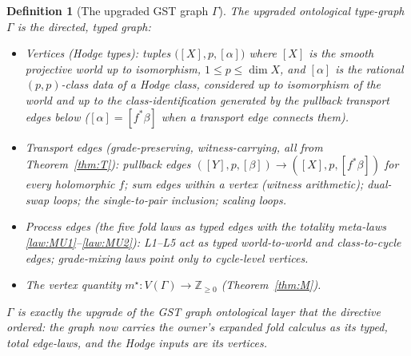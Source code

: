 \documentclass[11pt]{article}
\newtheorem{definition}[theorem]{Definition}
\newcommand{\Z}{\mathbb{Z}}
\begin{document}
\begin{definition}[The upgraded GST graph $\Gamma$]
\label{def:gamma}
The \emph{upgraded ontological type-graph} $\Gamma$ is the directed,
typed graph:
\begin{itemize}
\item \emph{Vertices} (Hodge types): tuples
$\bigl([X],p,[\alpha]\bigr)$ where $[X]$ is the smooth projective world up
to isomorphism, $1\le p\le\dim X$, and $[\alpha]$ is the rational
$(p,p)$-class data of a Hodge class, considered up to isomorphism of the
world and up to the class-identification generated by the pullback transport
edges below ($[\alpha]=[f^*\beta]$ when a transport edge connects them).
\item \emph{Transport edges} (grade-preserving, witness-carrying, all from
Theorem~\ref{thm:T}): pullback edges
$([Y],p,[\beta])\to([X],p,[f^*\beta])$ for every holomorphic $f$;
sum edges within a vertex (witness arithmetic); dual-swap loops; the
single-to-pair inclusion; scaling loops.
\item \emph{Process edges} (the five fold laws as typed edges with the
totality meta-laws \ref{law:MU1}--\ref{law:MU2}): L1--L5 act as typed
world-to-world and class-to-cycle edges; grade-mixing laws point only to
cycle-level vertices.
\item \emph{The vertex quantity} $m^\star\colon V(\Gamma)\to\Z_{\ge0}$
(Theorem~\ref{thm:M}).
\end{itemize}
$\Gamma$ is exactly the upgrade of the GST graph ontological layer that the
directive ordered: the graph now carries the owner's expanded fold calculus
as its typed, total edge-laws, and the Hodge inputs are its vertices.
\end{definition}
\end{document}
